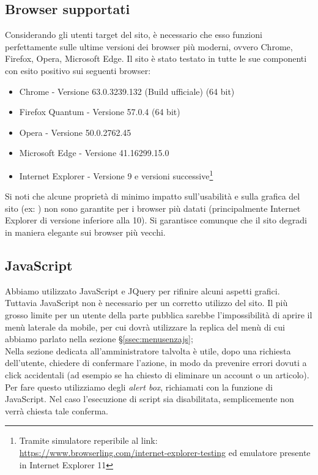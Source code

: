 \documentclass[12pt]{article}
\begin{document}
	\subsection{Browser supportati}
	
	Considerando gli utenti target del sito, è necessario che esso funzioni perfettamente sulle ultime versioni dei browser più moderni, ovvero Chrome, Firefox, Opera, Microsoft Edge. Il sito è stato testato in tutte le sue componenti con esito positivo sui seguenti browser:
	
	\begin{itemize}
		\item Chrome - Versione 63.0.3239.132 (Build ufficiale) (64 bit)
		\item Firefox Quantum - Versione 57.0.4 (64 bit)
		\item Opera - Versione 50.0.2762.45 
		\item Microsoft Edge - Versione 41.16299.15.0
		\item Internet Explorer - Versione 9 e versioni successive\footnote{Tramite simulatore reperibile al link:\\ \url{https://www.browserling.com/internet-explorer-testing} ed emulatore presente in Internet Explorer 11}
	\end{itemize} 

	\noindent Si noti che alcune proprietà di minimo impatto sull'usabilità e sulla grafica del sito (ex: ) non sono garantite per i browser più datati (principalmente Internet Explorer di versione inferiore alla 10). Si garantisce comunque che il sito degradi in maniera elegante sui browser più vecchi.

	\subsection{JavaScript}
	Abbiamo utilizzato JavaScript e JQuery per rifinire alcuni aspetti grafici. Tuttavia JavaScript non è necessario per un corretto utilizzo del sito. Il più grosso limite per un utente della parte pubblica sarebbe l'impossibilità di aprire il menù laterale da mobile, per cui dovrà utilizzare la replica del menù di cui abbiamo parlato nella sezione §\ref{ssec:menusenzajs};\\
	Nella sezione dedicata all'amministratore talvolta è utile, dopo una richiesta dell'utente, chiedere di confermare l'azione, in modo da prevenire errori dovuti a click accidentali (ad esempio se ha chiesto di eliminare un account o un articolo). Per fare questo utilizziamo degli \textit{alert box}, richiamati con la funzione  di JavaScript. Nel caso l'esecuzione di script sia disabilitata, semplicemente non verrà chiesta tale conferma.
\end{document}
